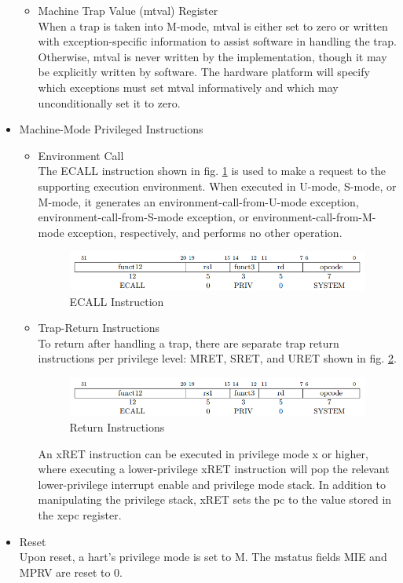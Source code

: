 \documentclass[../main.tex]{subfiles}
\begin{document}
\begin{itemize}
\begin{itemize}
            \item Machine Trap Value (mtval) Register\\
            When a trap is taken into M-mode, mtval is either set to zero or written with exception-specific information to assist software in handling the trap. Otherwise, mtval is never written by the implementation, though it may be explicitly written by software. The hardware platform will specify which exceptions must set mtval informatively and which may unconditionally set it to zero.
        \end{itemize}
        
    \item[2- ]Machine-Mode Privileged Instructions
        \begin{itemize}
            \item Environment Call\\
            The ECALL instruction shown in fig. \ref{fig:ecall} is used to make a request to the supporting execution environment. When executed in U-mode, S-mode, or M-mode, it generates an environment-call-from-U-mode exception, environment-call-from-S-mode exception, or environment-call-from-M-mode exception, respectively, and performs no other operation.\\
            \begin{figure}[h!]
            \centering
            \includegraphics[width=10 cm]{diagrams/ecall.png}
            \caption{ECALL Instruction}
            \label{fig:ecall}
            \end{figure}
            
            \item Trap-Return Instructions\\
            To return after handling a trap, there are separate trap return instructions per privilege level: MRET, SRET, and URET shown in fig. \ref{fig:ret}.\\
            \begin{figure}[h!]
            \centering
            \includegraphics[width=10 cm]{diagrams/ecall.png}
            \caption{Return Instructions}
            \label{fig:ret}
            \end{figure}An xRET instruction can be executed in privilege mode x or higher, where executing a lower-privilege xRET instruction will pop the relevant lower-privilege interrupt enable and privilege mode stack. In addition to manipulating the privilege stack, xRET sets the pc to the value stored in the xepc register.
        \end{itemize}
    \item[3- ]Reset\\
    Upon reset, a hart’s privilege mode is set to M. The mstatus fields MIE and MPRV are reset to 0.
\end{itemize}
\end{document}
